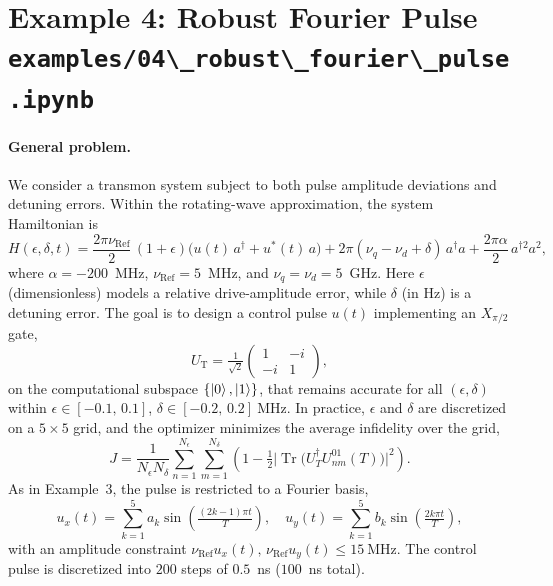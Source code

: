 \documentclass[a4paper,12pt]{article}
\DeclareMathOperator{\R}{Ref}
\DeclareMathOperator{\Tr}{Tr}
\newcommand{\mcode}[1]{\protect\lstinline[basicstyle=\color{black}\ttfamily]!#1!}
\begin{document}
\newpage
\section*{Example 4: Robust Fourier Pulse\\
\mcode{examples/04\_robust\_fourier\_pulse.ipynb}}
{}

\paragraph*{General problem.}
We consider a transmon system subject to both pulse amplitude deviations
and detuning errors. Within the rotating-wave approximation, the system
Hamiltonian is
\[
    H(\epsilon,\delta,t) = \frac{2\pi \nu_{\R}}{2}\,(1+\epsilon)\big( u(t)\,a^{\dagger} + u^{*}(t)\,a \big)
    + 2\pi(\nu_q - \nu_d + \delta)\,a^{\dagger}a
    + \frac{2\pi \alpha}{2}\,a^{\dagger 2} a^{2},
\]
where $\alpha = -200$~MHz, $\nu_{\R} = 5$~MHz, and $\nu_q = \nu_d = 5$~GHz.
Here $\epsilon$ (dimensionless) models a relative drive-amplitude error,
while $\delta$ (in Hz) is a detuning error. The goal is to design a control
pulse $u(t)$ implementing an $X_{\pi/2}$ gate,
\[
    U_{\mathrm{T}} = \tfrac{1}{\sqrt{2}}\begin{pmatrix}
        1 & -i \\
        -i & 1
    \end{pmatrix},
\]
on the computational subspace $\{\ket{0},\ket{1}\}$, that remains accurate
for all $(\epsilon,\delta)$ within
$\epsilon \in [-0.1,\,0.1]$, $\delta \in [-0.2,\,0.2]~\mathrm{MHz}$. In
practice, $\epsilon$ and $\delta$ are discretized on a $5\times5$ grid, and
the optimizer minimizes the average infidelity over the grid,
\[
    J = \frac{1}{N_{\epsilon}N_{\delta}}\sum_{n=1}^{N_{\epsilon}} \sum_{m=1}^{N_{\delta}} \left( 1 - \tfrac{1}{2} \Big|\Tr\big(U_T^{\dagger} U_{nm}^{01}(T)\big)\Big|^2 \right).
\]
As in Example~3, the pulse is restricted to a Fourier basis,
\[
u_x(t) = \sum_{k=1}^{5} a_k \sin\!\left(\tfrac{(2k-1)\pi t}{T}\right), \quad
u_y(t) = \sum_{k=1}^{5} b_k \sin\!\left(\tfrac{2k\pi t}{T}\right),
\]
with an amplitude constraint $\nu_{\R}u_x(t),\,\nu_{\R}u_y(t)\leq 15~\mathrm{MHz}$.
The control pulse is discretized into $200$ steps of $0.5$~ns ($100$~ns total).
\end{document}
